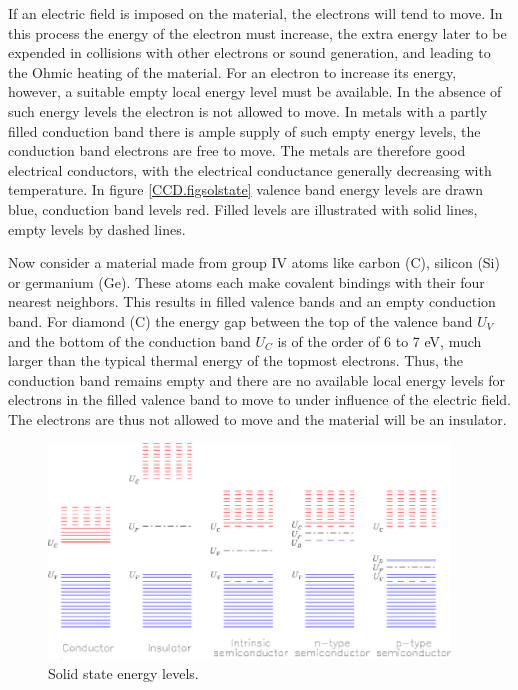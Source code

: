 If an electric field is imposed on the material, the electrons will
tend to move. In this process the energy of the electron must
increase, the extra energy later to be expended in collisions with
other electrons or sound generation, and leading to the Ohmic heating
of the material. For an electron to increase its energy, however, a
suitable empty local energy level must be available. In the absence of
such energy levels the electron is not allowed to move. In metals with
a partly filled conduction band there is ample supply of such empty
energy levels, the conduction band electrons are free to move. The
metals are therefore good electrical conductors, with the electrical
conductance generally decreasing with temperature. In figure
\ref{CCD.figsolstate} valence band energy levels are drawn blue,
conduction band levels red. Filled levels are illustrated with
solid lines, empty levels by dashed lines. 


Now consider a material made from group IV atoms like carbon (C),
silicon (Si) or germanium (Ge).  These atoms each make covalent
bindings with their four nearest neighbors. This results in filled
valence bands and an empty conduction band.  For diamond (C) the
energy gap between the top of the valence band $U_V$ and the bottom of
the conduction band $U_C$ is of the order of 6 to 7 eV, much larger
than the typical thermal energy of the topmost electrons. Thus, the
conduction band remains empty and there are no available local energy
levels for electrons in the filled valence band to move to under
influence of the electric field. The electrons are thus not allowed to
move and the material will be an insulator.

\begin{figure}[h]
	\centering
	\includegraphics[width=0.95\textwidth]{CCD_solstate.eps}
	\caption{Solid state energy levels.}
	\label{fig:CCD.figsolstate}
\end{figure}

